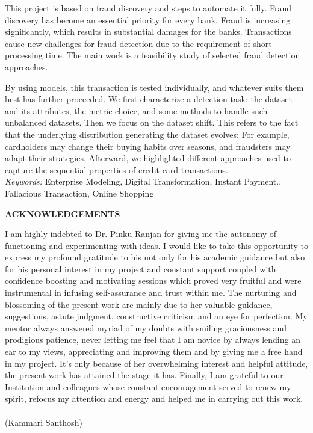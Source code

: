 \documentclass[12pt]{article}
\begin{document}
This project is based on fraud discovery and steps to automate it fully. Fraud discovery has become an essential priority for every bank. Fraud is increasing significantly, which results in substantial damages for the banks. Transactions cause new challenges for fraud detection due to the requirement of short processing time. The main work is a feasibility study of selected fraud detection approaches.  

By using models, this transaction is tested individually, and whatever suits them best has further proceeded. We first characterize a detection task: the dataset and its attributes, the metric choice, and some methods to handle such unbalanced datasets. Then we focus on the dataset shift. This refers to the fact that the underlying distribution generating the dataset evolves: For example, cardholders may change their buying habits over seasons, and fraudsters may adapt their strategies. Afterward, we highlighted different approaches used to capture the sequential properties of credit card transactions. \\
{\it Keywords:} Enterprise Modeling, Digital Transformation, Instant Payment., Fallacious Transaction, Online Shopping 
\newline
\begin{center}
{\large \bf ACKNOWLEDGEMENTS}
\end{center} 

I am highly indebted to  Dr. Pinku Ranjan  for giving me the autonomy of functioning
and experimenting with ideas. I would like to take this opportunity to express my profound
gratitude to his not only for his academic guidance but also for his personal interest in my
project and constant support coupled with confidence boosting and motivating sessions which
proved very fruitful and were instrumental in infusing self-assurance and trust within me. The
nurturing and blossoming of the present work are mainly due to her valuable guidance,
suggestions, astute judgment, constructive criticism and an eye for perfection. My mentor
always answered myriad of my doubts with smiling graciousness and prodigious patience, never
letting me feel that I am novice by always lending an ear to my views, appreciating and
improving them and by giving me a free hand in my project. It’s only because of her
overwhelming interest and helpful attitude, the present work has attained the stage it has.
Finally, I am grateful to our Institution and colleagues whose constant encouragement served
to renew my spirit, refocus my attention and energy and helped me in carrying out this work.
\\
\\
(Kammari Santhosh)
\pagebreak
\renewcommand*\contentsname{TABLE OF CONTENTS}
\tableofcontents 
\newpage
\listoffigures
\listoftables\newpage
\clearpage
\newpage
\end{document}

